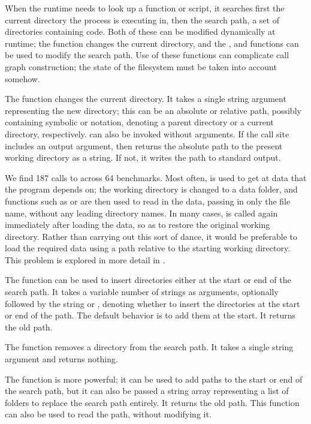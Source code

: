 When the \matlab runtime needs to look up a function or script, it searches
first the current directory the process is executing in, then the \matlab search
path, a set of directories containing \matlab code. Both of these can be
modified dynamically at runtime; the  function changes the current
directory, and the ,  and  functions can
be used to modify the search path. Use of these functions can complicate call
graph construction; the state of the filesystem must be taken into account
somehow.

The  function changes the current directory. It takes a single string
argument representing the new directory; this can be an absolute or relative
path, possibly containing symbolic  or  notation, denoting a
parent directory or a current directory, respectively.  can also be
invoked without arguments. If the call site includes an output argument, then
 returns the absolute path to the present working directory as a
string. If not, it writes the path to standard output.

We find 187 calls to  across 64 benchmarks. Most often,  is
used to get at data that the program depends on; the working directory is
changed to a data folder, and functions such as  or 
are then used to read in the data, passing in only the file name, without any
leading directory names. In many cases,  is called again immediately
after loading the data, so as to restore the original working directory. Rather
than carrying out this sort of dance, it would be preferable to load the
required data using a path relative to the starting working directory. This
problem is explored in more detail in .

The  function can be used to insert directories either at the
start or end of the \matlab search path. It takes a variable number of strings
as arguments, optionally followed by the string  or
, denoting whether to insert the directories at the start or end
of the path. The default behavior is to add them at the start. It returns the
old path.

The  function removes a directory from the search path. It takes a
single string argument and returns nothing.

The  function is more powerful; it can be used to add paths to the
start or end of the search path, but it can also be passed a string array
representing a list of folders to replace the search path entirely. It returns
the old path. This function can also be used to read the path, without
modifying it.

